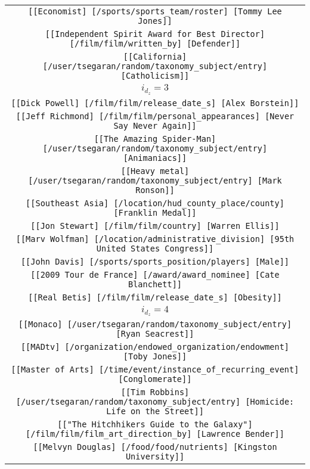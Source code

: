 \begin{longtable}{|c|}
    \texttt{[[Economist] [/sports/sports\_team/roster] [Tommy Lee Jones]]}\\
    \texttt{[[Independent Spirit Award for Best Director] [/film/film/written\_by] [Defender]]}\\
    \texttt{[[California] [/user/tsegaran/random/taxonomy\_subject/entry] [Catholicism]]}\\
    \hline 
    \rowcolor[HTML]{EFEFEF} 
    \textsc{$i_{d_z}=3$}\\ \hline 
    \texttt{[[Dick Powell] [/film/film/release\_date\_s] [Alex Borstein]]}\\
    \texttt{[[Jeff Richmond] [/film/film/personal\_appearances] [Never Say Never Again]]}\\
    \texttt{[[The Amazing Spider-Man] [/user/tsegaran/random/taxonomy\_subject/entry] [Animaniacs]]}\\
    \texttt{[[Heavy metal] [/user/tsegaran/random/taxonomy\_subject/entry] [Mark Ronson]]}\\
    \texttt{[[Southeast Asia] [/location/hud\_county\_place/county] [Franklin Medal]]}\\
    \texttt{[[Jon Stewart] [/film/film/country] [Warren Ellis]]}\\
    \texttt{[[Marv Wolfman] [/location/administrative\_division] [95th United States Congress]]}\\
    \texttt{[[John Davis] [/sports/sports\_position/players] [Male]]}\\
    \texttt{[[2009 Tour de France] [/award/award\_nominee] [Cate Blanchett]]}\\
    \texttt{[[Real Betis] [/film/film/release\_date\_s] [Obesity]]}\\
    \hline 
    \rowcolor[HTML]{EFEFEF} 
    \textsc{$i_{d_z}=4$}\\ \hline 
    \texttt{[[Monaco] [/user/tsegaran/random/taxonomy\_subject/entry] [Ryan Seacrest]]}\\
    \texttt{[[MADtv] [/organization/endowed\_organization/endowment] [Toby Jones]]}\\
    \texttt{[[Master of Arts] [/time/event/instance\_of\_recurring\_event] [Conglomerate]]}\\
    \texttt{[[Tim Robbins] [/user/tsegaran/random/taxonomy\_subject/entry] [Homicide: Life on the Street]]}\\
    \texttt{[["The Hitchhikers Guide to the Galaxy"] [/film/film/film\_art\_direction\_by] [Lawrence Bender]]}\\
    \texttt{[[Melvyn Douglas] [/food/food/nutrients] [Kingston University]]}\\

\end{longtable}
